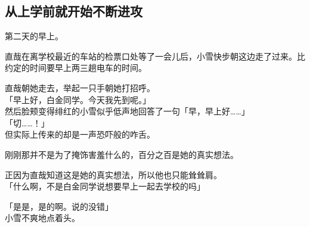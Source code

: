 \subsection{从上学前就开始不断进攻}

第二天的早上。

直哉在离学校最近的车站的检票口处等了一会儿后，小雪快步朝这边走了过来。比约定的时间要早上两三趟电车的时间。

直哉朝她走去，举起一只手朝她打招呼。\\

「早上好，白金同学。今天我先到呢。」\\

然后脸颊变得绯红的小雪似乎低声地回答了一句「早，早上好……」\\

「切……！」\\

但实际上传来的却是一声恐吓般的咋舌。

刚刚那并不是为了掩饰害羞什么的，百分之百是她的真实想法。

正因为直哉知道这是她的真实想法，所以他也只能耸耸肩。\\

「什么啊，不是白金同学说想要早上一起去学校的吗」

「是是，是的啊。说的没错」\\

小雪不爽地点着头。\\

